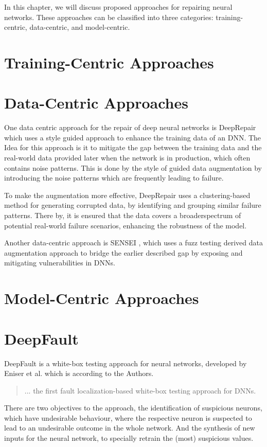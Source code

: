 In this chapter, we will discuss proposed approaches for repairing neural networks.
These approaches \cite{nakagawa_experience_2023} can be classified into three categories: training-centric, data-centric, and model-centric.

\section{Training-Centric Approaches}\label{sec:training-centric-approaches}


\section{Data-Centric Approaches}\label{sec:data-centric-approaches}
One data centric approach for the repair of deep neural networks is DeepRepair \cite{yu_deeprepair_2022} which uses a style guided approach to enhance the training data of an DNN. The Idea for this approach is it to mitigate the gap between the training data and the real-world data provided later when the network is in production, which often contains noise patterns.
This is done by the style of guided data augmentation by introducing the noise patterns which are frequently leading to failure.

To make the augmentation more effective, DeepRepair uses a clustering-based method for generating corrupted data, by identifying and grouping similar failure patterns.
There by, it is ensured that the data covers a broaderspectrum of potential real-world failure scenarios, enhancing the robustness of the model.

Another data-centric approach is SENSEI \cite{gao_fuzz_2020}, which uses a fuzz testing derived data augmentation approach to bridge the earlier described gap by exposing and mitigating vulnerabilities in DNNs.

\section{Model-Centric Approaches}\label{sec:model-centric-approaches}


\section{DeepFault}\label{sec:deepfault}
DeepFault\cite{eniser_deepfault_2019} is a white-box testing approach for neural networks, developed by Eniser et al. which is according to the Authors.
\begin{quote}
    ... the first fault localization-based white-box testing approach for DNNs.
\end{quote}
There are two objectives to the approach, the identification of suspicious neurons, which have undesirable behaviour, where the respective neuron is suspected to lead to an undesirable outcome in the whole network.
And the synthesis of new inputs for the neural network, to specially retrain the (most) suspicious values.

